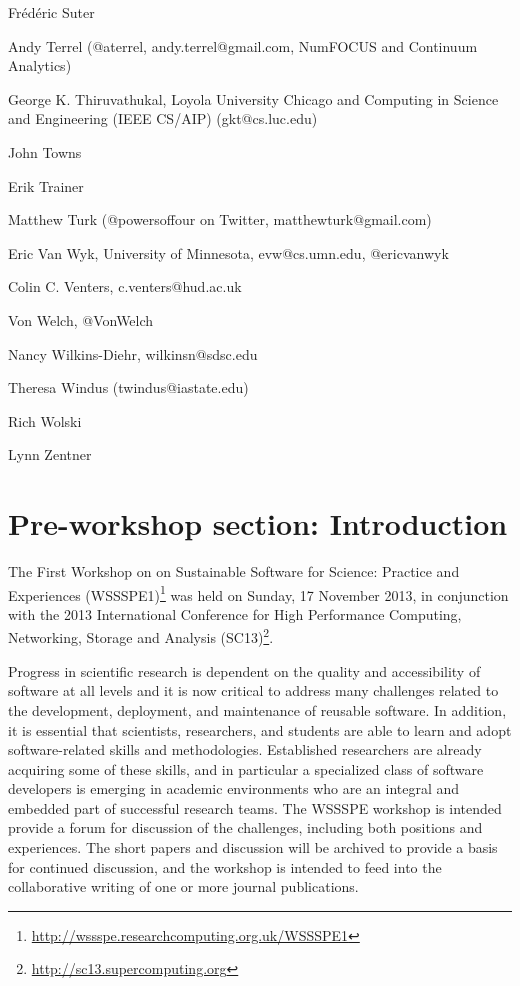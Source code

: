\documentclass[11pt, oneside]{amsart}
\begin{document}
Fr\'{e}d\'{e}ric Suter

Andy Terrel (@aterrel, andy.terrel@gmail.com, NumFOCUS and Continuum Analytics)

George K. Thiruvathukal, Loyola University Chicago and Computing in Science and Engineering (IEEE CS/AIP) (gkt@cs.luc.edu)

John Towns

Erik Trainer

Matthew Turk (@powersoffour on Twitter, matthewturk@gmail.com)

Eric Van Wyk, University of Minnesota, evw@cs.umn.edu, @ericvanwyk

Colin C. Venters, c.venters@hud.ac.uk

Von Welch, @VonWelch

Nancy Wilkins-Diehr, wilkinsn@sdsc.edu

Theresa Windus (twindus@iastate.edu)

Rich Wolski

Lynn Zentner



\section{Pre-workshop section: Introduction}

The First Workshop on on Sustainable Software for Science: Practice and Experiences (WSSSPE1)\footnote{\url{http://wssspe.researchcomputing.org.uk/WSSSPE1}} was held on Sunday, 17 November 2013, in conjunction with the 2013 International Conference for High Performance Computing, Networking, Storage and Analysis (SC13)\footnote{\url{http://sc13.supercomputing.org}}.

Progress in scientific research is dependent on the quality and accessibility of software at all levels and it is now critical to address many challenges related to the development, deployment, and maintenance of reusable software. In addition, it is essential that scientists, researchers, and students are able to learn and adopt software-related skills and methodologies. Established researchers are already acquiring some of these skills, and in particular a specialized class of software developers is emerging in academic environments who are an integral and embedded part of successful research teams. The WSSSPE workshop is intended provide a forum for discussion of the challenges, including both positions and experiences. The short papers and discussion will be archived to provide a basis for continued discussion, and the workshop is intended to feed into the collaborative writing of one or more journal publications.
\end{document}
